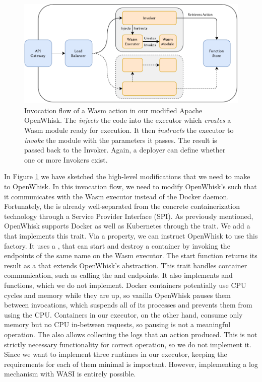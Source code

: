 \begin{figure}
    \centering
    \includegraphics[width=\textwidth]{figures/WasmOpenWhiskActionInvocationFlow.pdf}
    \caption{Invocation flow of a Wasm action in our modified Apache OpenWhisk. The  \emph{injects} the code into the executor which \emph{creates} a Wasm module ready for execution. It then \emph{instructs} the executor to \emph{invoke} the module with the parameters it passes. The result is passed back to the Invoker. Again, a deployer can define whether one or more Invokers exist.}
    \label{fig:wasm-openwhisk-action-invocation-flow}
\end{figure}

In Figure \ref{fig:wasm-openwhisk-action-invocation-flow} we have sketched the high-level modifications that we need to make to OpenWhisk. In this invocation flow, we need to modify OpenWhisk's  such that it communicates with the Wasm executor instead of the Docker daemon. Fortunately, the  is already well-separated from the concrete containerization technology through a Service Provider Interface (SPI). As previously mentioned, OpenWhisk supports Docker as well as Kubernetes through the  trait. We add a  that implements this trait. Via a property, we can instruct OpenWhisk to use this factory. It uses a , that can start and destroy a container by invoking the endpoints of the same name on the Wasm executor. The start function returns its result as a  that extends OpenWhisk's  abstraction. This trait handles container communication, such as calling the  and  endpoints. It also implements  and  functions, which we do not implement. Docker containers potentially use CPU cycles and memory while they are up, so vanilla OpenWhisk pauses them between invocations, which suspends all of its processes and prevents them from using the CPU. Containers in our executor, on the other hand, consume only memory but no CPU in-between requests, so pausing is not a meaningful operation. The  also allows collecting the logs that an action produced. This is not strictly necessary functionality for correct operation, so we do not implement it. Since we want to implement three runtimes in our executor, keeping the requirements for each of them minimal is important. However, implementing a log mechanism with WASI is entirely possible.

